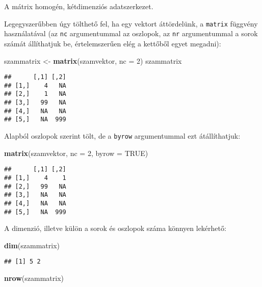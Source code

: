 \documentclass[]{book}
\newenvironment{Shaded}{\begin{snugshade}}{\end{snugshade}}
\newcommand{\KeywordTok}[1]{\textcolor[rgb]{0.13,0.29,0.53}{\textbf{#1}}}
\newcommand{\DataTypeTok}[1]{\textcolor[rgb]{0.13,0.29,0.53}{#1}}
\newcommand{\DecValTok}[1]{\textcolor[rgb]{0.00,0.00,0.81}{#1}}
\newcommand{\StringTok}[1]{\textcolor[rgb]{0.31,0.60,0.02}{#1}}
\newcommand{\OtherTok}[1]{\textcolor[rgb]{0.56,0.35,0.01}{#1}}
\newcommand{\NormalTok}[1]{#1}
\begin{document}
A mátrix homogén, kétdimenziós adatszerkezet.

Legegyszerűbben úgy tölthető fel, ha egy vektort áttördelünk, a
\texttt{matrix} függvény használatával (az \texttt{nc} argumentummal az
oszlopok, az \texttt{nr} argumentummal a sorok számát állíthatjuk be,
értelemszerűen elég a kettőből egyet megadni):

\begin{Shaded}
\begin{Highlighting}[]
\NormalTok{szammatrix <-}\StringTok{ }\KeywordTok{matrix}\NormalTok{(szamvektor, }\DataTypeTok{nc =} \DecValTok{2}\NormalTok{)}
\NormalTok{szammatrix}
\end{Highlighting}
\end{Shaded}

\begin{verbatim}
##      [,1] [,2]
## [1,]    4   NA
## [2,]    1   NA
## [3,]   99   NA
## [4,]   NA   NA
## [5,]   NA  999
\end{verbatim}

Alapból oszlopok szerint tölt, de a \texttt{byrow} argumentummal ezt
átállíthatjuk:

\begin{Shaded}
\begin{Highlighting}[]
\KeywordTok{matrix}\NormalTok{(szamvektor, }\DataTypeTok{nc =} \DecValTok{2}\NormalTok{, }\DataTypeTok{byrow =} \OtherTok{TRUE}\NormalTok{)}
\end{Highlighting}
\end{Shaded}

\begin{verbatim}
##      [,1] [,2]
## [1,]    4    1
## [2,]   99   NA
## [3,]   NA   NA
## [4,]   NA   NA
## [5,]   NA  999
\end{verbatim}

A dimenzió, illetve külön a sorok és oszlopok száma könnyen lekérhető:

\begin{Shaded}
\begin{Highlighting}[]
\KeywordTok{dim}\NormalTok{(szammatrix)}
\end{Highlighting}
\end{Shaded}

\begin{verbatim}
## [1] 5 2
\end{verbatim}

\begin{Shaded}
\begin{Highlighting}[]
\KeywordTok{nrow}\NormalTok{(szammatrix)}
\end{Highlighting}
\end{Shaded}
\end{document}
